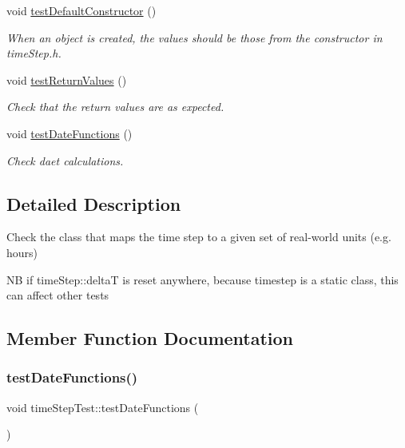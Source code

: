 \begin{DoxyCompactItemize}
\mbox{\label{classtimeStepTest_a3e6e3abcb3b887cd3ebbbacb3c6a812f}} 
void \mbox{\hyperlink{classtimeStepTest_a3e6e3abcb3b887cd3ebbbacb3c6a812f}{test\+Default\+Constructor}} ()
\begin{DoxyCompactList}\small\item\em When an object is created, the values should be those from the constructor in time\+Step.\+h. \end{DoxyCompactList}\item 
void \mbox{\hyperlink{classtimeStepTest_abb17f1970e1ec459c524ef87870f651f}{test\+Return\+Values}} ()
\begin{DoxyCompactList}\small\item\em Check that the return values are as expected. \end{DoxyCompactList}\item 
void \mbox{\hyperlink{classtimeStepTest_a35fe812055dc5fa7f53eb898d568256c}{test\+Date\+Functions}} ()
\begin{DoxyCompactList}\small\item\em Check daet calculations. \end{DoxyCompactList}\end{DoxyCompactItemize}


\subsection{Detailed Description}
Check the class that maps the time step to a given set of real-\/world units (e.\+g. hours) 

NB if time\+Step\+::deltaT is reset anywhere, because timestep is a static class, this can affect other tests 

\subsection{Member Function Documentation}
\mbox{\label{classtimeStepTest_a35fe812055dc5fa7f53eb898d568256c}} 
\subsubsection{\texorpdfstring{test\+Date\+Functions()}{testDateFunctions()}}
{\footnotesize\ttfamily void time\+Step\+Test\+::test\+Date\+Functions (\begin{DoxyParamCaption}{ }\end{DoxyParamCaption})\hspace{0.3cm}{\ttfamily [inline]}}



